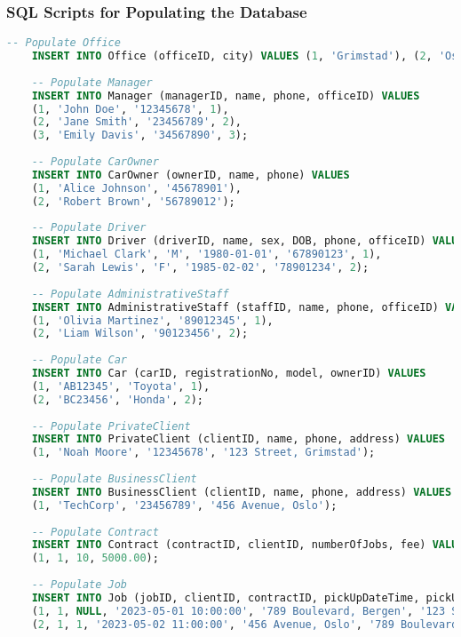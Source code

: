 \documentclass[a4paper,12pt]{article}
\begin{document}
\subsubsection*{SQL Scripts for Populating the Database}
\begin{lstlisting}[language=SQL]
    -- Populate Office
    INSERT INTO Office (officeID, city) VALUES (1, 'Grimstad'), (2, 'Oslo'), (3, 'Bergen');
    
    -- Populate Manager
    INSERT INTO Manager (managerID, name, phone, officeID) VALUES 
    (1, 'John Doe', '12345678', 1),
    (2, 'Jane Smith', '23456789', 2),
    (3, 'Emily Davis', '34567890', 3);
    
    -- Populate CarOwner
    INSERT INTO CarOwner (ownerID, name, phone) VALUES 
    (1, 'Alice Johnson', '45678901'),
    (2, 'Robert Brown', '56789012');
    
    -- Populate Driver
    INSERT INTO Driver (driverID, name, sex, DOB, phone, officeID) VALUES 
    (1, 'Michael Clark', 'M', '1980-01-01', '67890123', 1),
    (2, 'Sarah Lewis', 'F', '1985-02-02', '78901234', 2);
    
    -- Populate AdministrativeStaff
    INSERT INTO AdministrativeStaff (staffID, name, phone, officeID) VALUES 
    (1, 'Olivia Martinez', '89012345', 1),
    (2, 'Liam Wilson', '90123456', 2);
    
    -- Populate Car
    INSERT INTO Car (carID, registrationNo, model, ownerID) VALUES 
    (1, 'AB12345', 'Toyota', 1),
    (2, 'BC23456', 'Honda', 2);
    
    -- Populate PrivateClient
    INSERT INTO PrivateClient (clientID, name, phone, address) VALUES 
    (1, 'Noah Moore', '12345678', '123 Street, Grimstad');
    
    -- Populate BusinessClient
    INSERT INTO BusinessClient (clientID, name, phone, address) VALUES 
    (1, 'TechCorp', '23456789', '456 Avenue, Oslo');
    
    -- Populate Contract
    INSERT INTO Contract (contractID, clientID, numberOfJobs, fee) VALUES 
    (1, 1, 10, 5000.00);
    
    -- Populate Job
    INSERT INTO Job (jobID, clientID, contractID, pickUpDateTime, pickUpAddress, dropOffAddress, mileage, charge, status) VALUES 
    (1, 1, NULL, '2023-05-01 10:00:00', '789 Boulevard, Bergen', '123 Street, Grimstad', 10, 100.00, 'Completed'),
    (2, 1, 1, '2023-05-02 11:00:00', '456 Avenue, Oslo', '789 Boulevard, Bergen', 20, NULL, 'Completed');
    
\end{lstlisting}
\end{document}
